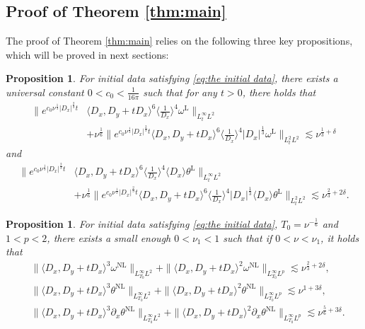 \documentclass[reqno, 12pt]{amsart} %
\theoremstyle{plain} %
\newtheorem{Prop}[Thm]{Proposition}
\theoremstyle{definition}
\theoremstyle{remark}
\numberwithin{equation}{section} %
\newcommand{\px}{\partial_x}
\begin{document}
	
	\subsection{Proof of Theorem \ref{thm:main}} The proof of Theorem \ref{thm:main} relies on the following three key propositions, which will be proved in next sections:
	\begin{Prop} \label{lem:linear theta}
		For initial data satisfying \eqref{eq:the initial data}, there exists a universal constant $0<c_0<\frac{1}{16\pi}$ such that for any $t>0$, there holds that
		\begin{equation*}
			\begin{aligned}
				\| e^{c_0 \nu^\frac13  \left|D_x\right|^\frac23 t}   &\langle D_x, D_y+t D_x\rangle^6  \langle\frac{1}{D_x}\rangle^4  \omega^{\mathrm{L}}\|_{L_t^{\infty} L^2}  \\
				& +\nu^{\frac{1}{6}}\|e^{c_0 \nu^\frac13 \left|D_x\right|^\frac23 t}\langle D_x, D_y+t D_x\rangle^6\langle\frac{1}{D_x}\rangle^4\left|D_x\right|^{\frac{1}{3}} \omega^{\mathrm{L}}\|_{L_t^2 L^2} \lesssim \nu^{\frac{1}{3}+ \delta}
			\end{aligned}
		\end{equation*}
		and
		\begin{equation*}
			\begin{aligned}
				\| e^{c_0 \nu^\frac13  \left|D_x\right|^\frac23 t}   &\langle D_x, D_y+t D_x\rangle^6  \langle\frac{1}{D_x}\rangle^4  \langle D_x \rangle \theta^{\mathrm{L}}\|_{L_t^{\infty} L^2}  \\
				& +\nu^{\frac{1}{6}}\|e^{c_0 \nu^\frac13 \left|D_x\right|^\frac23 t}\langle D_x, D_y+t D_x\rangle^6\langle\frac{1}{D_x}\rangle^4\left|D_x\right|^{\frac{1}{3}} \langle D_x \rangle \theta^{\mathrm{L}}\|_{L_t^2 L^2} \lesssim \nu^{\frac{2}{3}+ 2\delta} .
			\end{aligned}
		\end{equation*}
	\end{Prop}
	
	\begin{Prop} \label{cor}
		For initial data satisfying \eqref{eq:the initial data}, $T_0 = \nu^{-\frac16}$ and $1<p<2$, there exists a small enough $0< \nu_1<1$ such that if $0<\nu<\nu_1$, it holds that
		\begin{equation}\begin{aligned} \label{eq:temp7}
				&\|\langle D_x, D_y+t D_x\rangle^3 \omega^{\mathrm{NL}}\|_{L_{T_0}^\infty L^2} + \|\langle D_x, D_y+t D_x\rangle^2 \omega^{\mathrm{NL}}\|_{L_{T_0}^\infty L^p} \lesssim \nu^{\frac23 + 2\delta}, \\
				&\|\langle D_x, D_y+t D_x\rangle^3 \theta^{\mathrm{NL}}\|_{L_{T_0}^\infty L^2} + \|\langle D_x, D_y+t D_x\rangle^2 \theta^{\mathrm{NL}}\|_{L_{T_0}^\infty L^p} \lesssim \nu^{1 + 3\delta}, \\
				&\|\langle D_x, D_y+t D_x\rangle^3 \px \theta^{\mathrm{NL}}\|_{L_{T_0}^\infty L^2} + \|\langle D_x, D_y+t D_x\rangle^2 \px \theta^{\mathrm{NL}}\|_{L_{T_0}^\infty L^p} \lesssim \nu^{\frac56 + 3\delta}.
		\end{aligned}\end{equation}
	\end{Prop}
	
\end{document}
